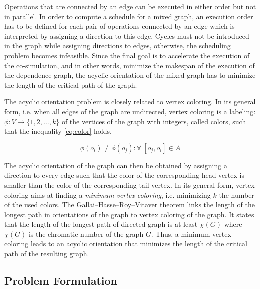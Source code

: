 Operations that are connected by an edge can be executed in either order but not in parallel. In order to compute a schedule for a mixed graph, an execution order has to be defined for each pair of operations connected by an edge which is interpreted by assigning a direction to this edge. Cycles must not be introduced in the graph while assigning directions to edges, otherwise, the scheduling problem becomes infeasible. Since the final goal is to accelerate the execution of the co-simulation, and in other words, minimize the makespan of the execution of the dependence graph, the acyclic orientation of the mixed graph has to minimize the length of the critical path of the graph.

The acyclic orientation problem is closely related to vertex coloring. In its general form, i.e. when all edges of the graph are undirected, vertex coloring is a labeling: $\phi: V \rightarrow \{1, 2, \ldots, k\}$ of the vertices of the graph with integers, called colors, such that the inequality \ref{eq:color} holds.

\begin{equation}
\phi(o_i) \neq \phi(o_j): \forall\ [o_j,o_i] \in A
\label{eq:color}
\end{equation}

The acyclic orientation of the graph can then be obtained by assigning a direction to every edge such that the color of the corresponding head vertex is smaller than the color of the corresponding tail vertex. In its general form, vertex coloring aims at finding a \textit{minimum vertex coloring}, i.e. minimizing $k$ the number of the used colors. The Gallai–Hasse–Roy–Vitaver theorem \cite{gallai:1968,roy:1967,hasse:1966,vitaver:1962} links the length of the longest path in orientations of the graph to vertex coloring of the graph. It states that the length of the longest path of directed graph is at least $\chi(G)$ where $\chi(G)$ is the chromatic number of the graph $G$. Thus, a minimum vertex coloring leads to an acyclic orientation that minimizes the length of the critical path of the resulting graph.

\subsection{Problem Formulation}

